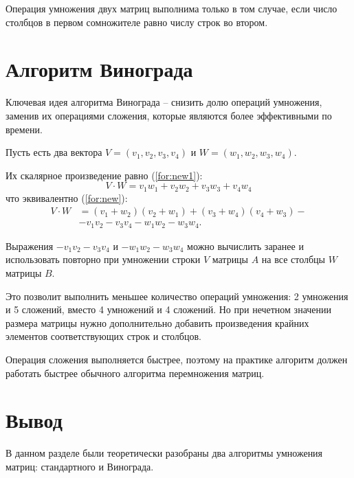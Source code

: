 Операция умножения двух матриц выполнима только в том случае, если число столбцов в первом сомножителе равно числу строк во втором.



\section{Алгоритм Винограда}
Ключевая идея алгоритма Винограда -- снизить долю операций умножения, заменив их операциями сложения, которые являются более эффективными по времени.

Пусть есть два вектора $V = (v_1, v_2, v_3, v_4)$ и $W = (w_1, w_2, w_3, w_4)$.

Их скалярное произведение равно (\ref{for:new1}): 
\begin{equation}
	\label{for:new1}
	V \cdot W = v_1w_1 + v_2w_2 + v_3w_3 + v_4w_4
\end{equation}
что эквивалентно (\ref{for:new}):
\begin{equation}
\begin{aligned}
	\label{for:new}
	V \cdot W &= (v_1 + w_2)(v_2 + w_1) + (v_3 + w_4)(v_4 + w_3) - \\
	&- v_1v_2 - v_3v_4 - w_1w_2 - w_3w_4.
\end{aligned}
\end{equation}

Выражения $- v_1v_2 - v_3v_4$ и $- w_1w_2 - w_3w_4$ можно вычислить заранее и использовать повторно при умножении строки $V$ матрицы $A$ на все столбцы $W$ матрицы $B$. 

Это позволит выполнить меньшее количество операций умножения: 2 умножения и 5 сложений, вместо 4 умножений и 4 сложений. Но при нечетном значении размера матрицы нужно дополнительно добавить произведения крайних элементов соответствующих строк и столбцов.

Операция сложения выполняется быстрее, поэтому на практике алгоритм должен работать быстрее обычного алгоритма перемножения матриц.

\section*{Вывод}
В данном разделе были теоретически разобраны два алгоритмы умножения матриц: стандартного и Винограда.


\clearpage
